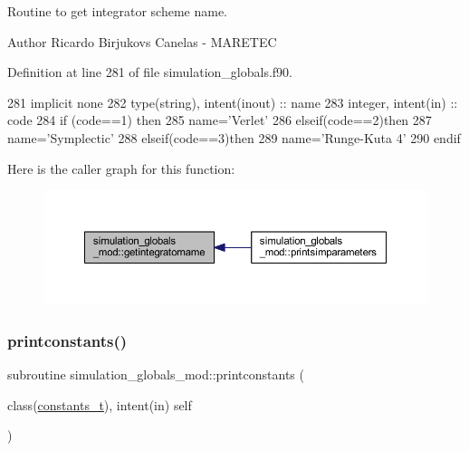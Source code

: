 Routine to get integrator scheme name. 

\begin{DoxyAuthor}{Author}
Ricardo Birjukovs Canelas -\/ M\+A\+R\+E\+T\+EC 
\end{DoxyAuthor}


Definition at line 281 of file simulation\+\_\+globals.\+f90.


\begin{DoxyCode}
281     \textcolor{keywordtype}{implicit none}
282     \textcolor{keywordtype}{type}(string), \textcolor{keywordtype}{intent(inout)} :: name
283     \textcolor{keywordtype}{integer}, \textcolor{keywordtype}{intent(in)} :: code
284     \textcolor{keywordflow}{if} (code==1) \textcolor{keywordflow}{then}
285         name=\textcolor{stringliteral}{'Verlet'}
286     \textcolor{keywordflow}{elseif}(code==2)\textcolor{keywordflow}{then}
287         name=\textcolor{stringliteral}{'Symplectic'}
288     \textcolor{keywordflow}{elseif}(code==3)\textcolor{keywordflow}{then}
289         name=\textcolor{stringliteral}{'Runge-Kuta 4'}
290 \textcolor{keywordflow}{    endif}
\end{DoxyCode}
Here is the caller graph for this function\+:\nopagebreak
\begin{figure}[H]
\begin{center}
\leavevmode
\includegraphics[width=350pt]{namespacesimulation__globals__mod_a68e871ed8e5d3930884e968c6fdafddc_icgraph}
\end{center}
\end{figure}
\mbox{\label{namespacesimulation__globals__mod_a20ba28d72a9bea823d9373a94f97026e}} 
\subsubsection{\texorpdfstring{printconstants()}{printconstants()}}
{\footnotesize\ttfamily subroutine simulation\+\_\+globals\+\_\+mod\+::printconstants (\begin{DoxyParamCaption}\item[{class(\mbox{\hyperlink{structsimulation__globals__mod_1_1constants__t}{constants\+\_\+t}}), intent(in)}]{self }\end{DoxyParamCaption})\hspace{0.3cm}{\ttfamily [private]}}



